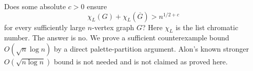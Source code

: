 Does some absolute $c>0$ ensure
\[
 \chi_L(G)+\chi_L(\overline G)>n^{1/2+c}
\]
for every sufficiently large $n$-vertex graph $G$? Here $\chi_L$ is the list chromatic number. The answer is no. We prove a sufficient counterexample bound $O(\sqrt n\log n)$ by a direct palette-partition argument. Alon's known stronger $O(\sqrt{n\log n})$ bound is not needed and is not claimed as proved here.
